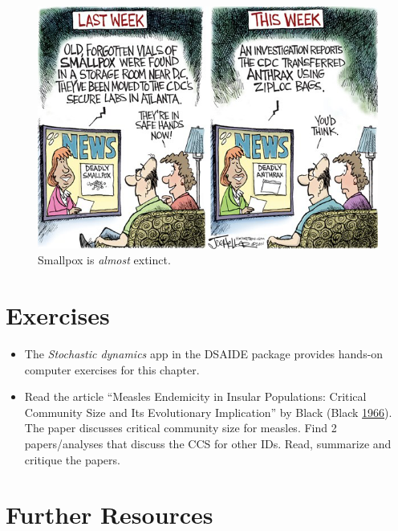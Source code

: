 \documentclass[]{book}
\providecommand{\tightlist}{%
  \setlength{\itemsep}{0pt}\setlength{\parskip}{0pt}}
\theoremstyle{definition}
\theoremstyle{definition}
\theoremstyle{definition}
\theoremstyle{remark}
\begin{document}
\begin{figure}
\centering
\includegraphics{./images/smallpox.png}
\caption{\label{fig:smallpox}Smallpox is \emph{almost} extinct.}
\end{figure}

\hypertarget{exercises-1}{%
\section{Exercises}\label{exercises-1}}

\begin{itemize}
\tightlist
\item
  The \emph{Stochastic dynamics} app in the DSAIDE package provides
  hands-on computer exercises for this chapter.
\item
  Read the article ``Measles Endemicity in Insular Populations: Critical
  Community Size and Its Evolutionary Implication'' by Black (Black
  \protect\hyperlink{ref-black66}{1966}). The paper discusses critical
  community size for measles. Find 2 papers/analyses that discuss the
  CCS for other IDs. Read, summarize and critique the papers.
\end{itemize}

\hypertarget{further-resources-6}{%
\section{Further Resources}\label{further-resources-6}}
\end{document}
